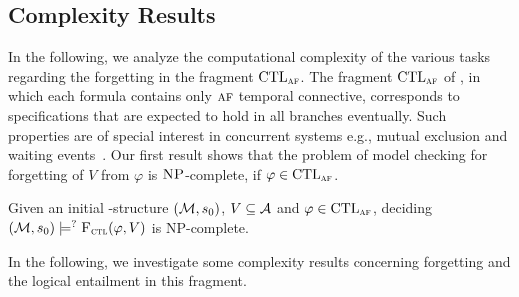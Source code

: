 \documentclass{article}
\begin{document}
\subsection{Complexity Results}
In the following, we analyze the computational complexity of the various tasks regarding the forgetting in the fragment $\textrm{CTL}_{\textsc{a}\textsc{f}}$.
The fragment $\textrm{CTL}_{\textsc{a}\textsc{f}}$ of \CTL, in which each formula contains only $\textsc{a} \textsc{f}$ temporal connective, corresponds to specifications that are expected to hold in all branches eventually. Such properties are of special interest in concurrent systems e.g., mutual exclusion and  waiting events~\cite{Baier:PMC:2008}. Our first result shows that the problem of model checking for forgetting of $V$ from $\varphi$ is $\textsc{NP}$-complete, if $\varphi \in \textrm{CTL}_{\textsc{a}\textsc{f}}$.
\begin{proposition}
	\label{modelChecking}
Given an initial \MPK-structure $({\cal M},s_0)$, $V\subseteq{\cal A}$ and $\varphi \in \textrm{CTL}_{\textsc{a}\textsc{f}}$,  deciding $({\cal M},s_0) \models^? {\textsc{F}_{\textsc{ctl}}}(\varphi, V)$ is \textsc{NP}-complete.
\end{proposition}


In the following, we investigate some complexity results concerning forgetting and the logical entailment in this fragment.

\end{document}
